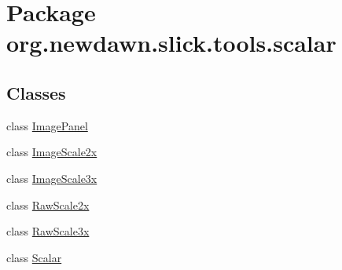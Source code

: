 \hypertarget{namespaceorg_1_1newdawn_1_1slick_1_1tools_1_1scalar}{}\section{Package org.\+newdawn.\+slick.\+tools.\+scalar}
\label{namespaceorg_1_1newdawn_1_1slick_1_1tools_1_1scalar}
\subsection*{Classes}
\begin{DoxyCompactItemize}
\item 
class \mbox{\hyperlink{classorg_1_1newdawn_1_1slick_1_1tools_1_1scalar_1_1_image_panel}{Image\+Panel}}
\item 
class \mbox{\hyperlink{classorg_1_1newdawn_1_1slick_1_1tools_1_1scalar_1_1_image_scale2x}{Image\+Scale2x}}
\item 
class \mbox{\hyperlink{classorg_1_1newdawn_1_1slick_1_1tools_1_1scalar_1_1_image_scale3x}{Image\+Scale3x}}
\item 
class \mbox{\hyperlink{classorg_1_1newdawn_1_1slick_1_1tools_1_1scalar_1_1_raw_scale2x}{Raw\+Scale2x}}
\item 
class \mbox{\hyperlink{classorg_1_1newdawn_1_1slick_1_1tools_1_1scalar_1_1_raw_scale3x}{Raw\+Scale3x}}
\item 
class \mbox{\hyperlink{classorg_1_1newdawn_1_1slick_1_1tools_1_1scalar_1_1_scalar}{Scalar}}
\end{DoxyCompactItemize}

